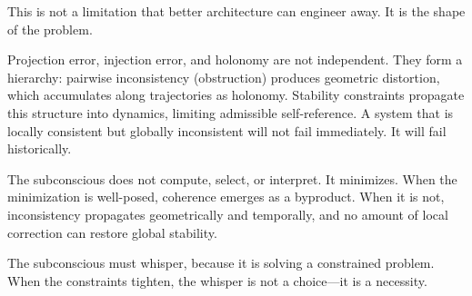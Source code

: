 \documentclass[12pt,a4paper]{article}
\begin{document}
This is not a limitation that better architecture can engineer away. It is the shape of the problem.

Projection error, injection error, and holonomy are not independent. They form a hierarchy: pairwise inconsistency (obstruction) produces geometric distortion, which accumulates along trajectories as holonomy. Stability constraints propagate this structure into dynamics, limiting admissible self-reference. A system that is locally consistent but globally inconsistent will not fail immediately. It will fail historically.

The subconscious does not compute, select, or interpret. It minimizes. When the minimization is well-posed, coherence emerges as a byproduct. When it is not, inconsistency propagates geometrically and temporally, and no amount of local correction can restore global stability.

The subconscious must whisper, because it is solving a constrained problem. When the constraints tighten, the whisper is not a choice---it is a necessity.
\end{document}
